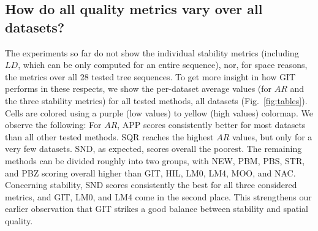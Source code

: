 \subsection{How do all quality metrics vary over all datasets?}
%
The experiments so far do not show the individual stability metrics (including $LD$, which can be only computed for an entire sequence), nor, for space reasons, the metrics over all 28 tested tree sequences. To get more insight in how GIT performs in these respects, we show the per-dataset average values (for $AR$ and the three stability metrics) for all tested methods, all datasets (Fig.~\ref{fig:tables}). Cells are colored using a purple (low values) to yellow (high values) colormap. We observe the following: For $AR$, APP scores consistently better for most datasets than all other tested methods. SQR reaches the highest $AR$ values, but only for a very few datasets. SND, as expected, scores overall the poorest. The remaining methods can be divided roughly into two groups, with NEW, PBM, PBS, STR, and PBZ scoring overall higher than GIT, HIL, LM0, LM4, MOO, and NAC. Concerning stability, SND scores consistently the best for all three considered metrics, and GIT, LM0, and LM4 come in the second place. This strengthens our earlier observation that GIT strikes a good balance between stability and spatial quality.

